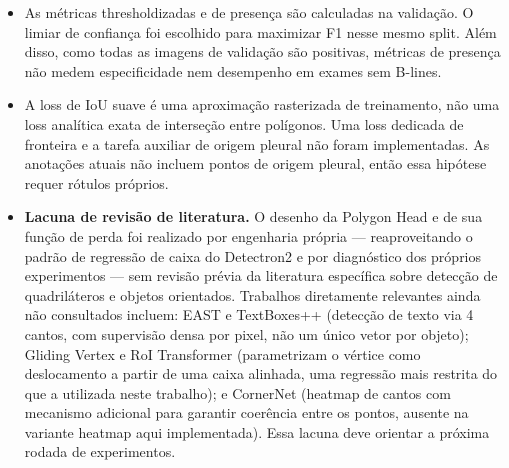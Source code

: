 \documentclass[11pt]{article}
\begin{document}
\begin{itemize}
\item As métricas thresholdizadas e de presença são calculadas na validação. O
limiar de confiança foi escolhido para maximizar F1 nesse mesmo split. Além disso,
como todas as imagens de validação são positivas, métricas de presença não medem
especificidade nem desempenho em exames sem B-lines.

\item A loss de IoU suave é uma aproximação rasterizada de treinamento, não uma
loss analítica exata de interseção entre polígonos. Uma loss dedicada de fronteira
e a tarefa auxiliar de origem pleural não foram implementadas. As anotações atuais
não incluem pontos de origem pleural, então essa hipótese requer rótulos próprios.

\item \textbf{Lacuna de revisão de literatura.} O desenho da Polygon Head e de sua
função de perda foi realizado por engenharia própria --- reaproveitando o padrão
de regressão de caixa do Detectron2 e por diagnóstico dos próprios experimentos
--- sem revisão prévia da literatura específica sobre detecção de quadriláteros e
objetos orientados. Trabalhos diretamente relevantes ainda não consultados
incluem: EAST e TextBoxes++ (detecção de texto via 4 cantos, com supervisão densa
por pixel, não um único vetor por objeto); Gliding Vertex e RoI Transformer
(parametrizam o vértice como deslocamento a partir de uma caixa alinhada, uma
regressão mais restrita do que a utilizada neste trabalho); e CornerNet (heatmap
de cantos com mecanismo adicional para garantir coerência entre os pontos,
ausente na variante heatmap aqui implementada). Essa lacuna deve orientar a
próxima rodada de experimentos.
\end{itemize}
\end{document}

